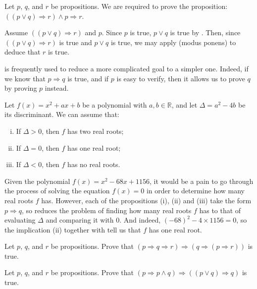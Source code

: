 \begin{example}
Let $p$, $q$, and $r$ be propositions. We are required to prove the proposition: $((p \vee q) \Rightarrow r) \wedge p \Rightarrow r$.

Assume $((p \vee q) \Rightarrow r)$ and $p$. Since $p$ is true, $p \vee q$ is true by . Then, since $((p \vee q) \Rightarrow r)$ is true and $p \vee q$ is true, we may apply  (modus ponens) to deduce that $r$ is true.
\end{example}

 is frequently used to reduce a more complicated goal to a simpler one. Indeed, if we know that $p \Rightarrow q$ is true, and if $p$ is easy to verify, then it allows us to prove $q$ by proving $p$ instead.

\begin{example}
Let $f(x) = x^2+ax+b$ be a polynomial with $a,b \in \mathbb{R}$, and let $\Delta = a^2-4b$ be its discriminant. We can assume that:
\begin{enumerate}[(i)]
\item If $\Delta > 0$, then $f$ has two real roots;
\item If $\Delta = 0$, then $f$ has one real root;
\item If $\Delta < 0$, then $f$ has no real roots.
\end{enumerate}
Given the polynomial $f(x) = x^2-68x+1156$, it would be a pain to go through the process of solving the equation $f(x)=0$ in order to determine how many real roots $f$ has. However, each of the propositions (i), (ii) and (iii) take the form $p \Rightarrow q$, so  reduces the problem of finding how many real roots $f$ has to that of evaluating $\Delta$ and comparing it with $0$. And indeed, $(-68)^2 - 4 \times 1156 = 0$, so the implication (ii) together with \elimrule{\Rightarrow} tell us that $f$ has one real root.
\end{example}

\begin{exercise}
Let $p$, $q$, and $r$ be propositions. Prove that $(p \Rightarrow q \Rightarrow r) \Rightarrow (q \Rightarrow (p \Rightarrow r))$ is true.
\end{exercise}

\begin{exercise}
Let $p$, $q$, and $r$ be propositions. Prove that $(p \Rightarrow p \wedge q) \Rightarrow ((p \vee q) \Rightarrow q)$ is true.
\end{exercise}


